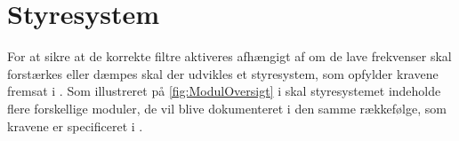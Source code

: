 \section{Styresystem}
\label{Styresystem}
%
For at sikre at de korrekte filtre aktiveres afhængigt af om de lave frekvenser skal forstærkes eller dæmpes skal der udvikles et styresystem, som opfylder kravene fremsat i . Som illustreret på \autoref{fig:ModulOversigt} i  skal styresystemet indeholde flere forskellige moduler, de vil blive dokumenteret i den samme rækkefølge, som kravene er specificeret i .  
%







